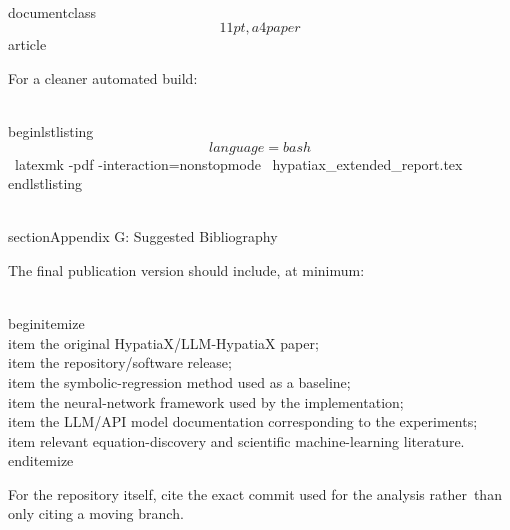 \\documentclass\[11pt,a4paper\]{article}
\begin{document}
 For a cleaner automated build:

 \\begin{lstlisting}\[language=bash\]\
 latexmk -pdf -interaction=nonstopmode \
 hypatiax\_extended\_report.tex\
 \\end{lstlisting}

 \\section{Appendix G: Suggested Bibliography}\

 The final publication version should include, at minimum:

 \\begin{itemize}\
 \\item the original HypatiaX/LLM-HypatiaX paper;\
 \\item the repository/software release;\
 \\item the symbolic-regression method used as a baseline;\
 \\item the neural-network framework used by the implementation;\
 \\item the LLM/API model documentation corresponding to the experiments;\
 \\item relevant equation-discovery and scientific machine-learning literature.\
 \\end{itemize}

 For the repository itself, cite the exact commit used for the analysis rather\
 than only citing a moving branch.

 \
\end{document}
